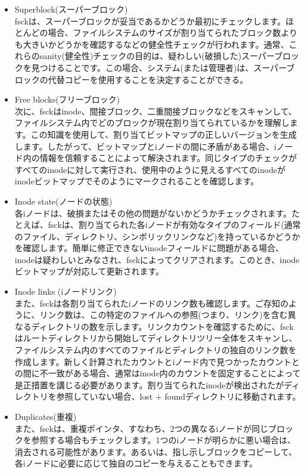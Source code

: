 \begin{itemize}
\item
  Superblock(スーパーブロック)\\
  fsckは、スーパーブロックが妥当であるかどうか最初にチェックします。ほとんどの場合、ファイルシステムのサイズが割り当てられたブロック数よりも大きいかどうかを確認するなどの健全性チェックが行われます。通常、これらのsanity(健全性)チェックの目的は、疑わしい(破損した)スーパーブロックを見つけることです。この場合、システム(または管理者)は、スーパーブロックの代替コピーを使用することを決定することができる。
\item
  Free blocks(フリーブロック)\\
  次に、fsckはinode、間接ブロック、二重間接ブロックなどをスキャンして、ファイルシステム内でどのブロックが現在割り当てられているかを理解します。この知識を使用して、割り当てビットマップの正しいバージョンを生成します。したがって、ビットマップとiノードの間に矛盾がある場合、iノード内の情報を信頼することによって解決されます。同じタイプのチェックがすべてのinodeに対して実行され、使用中のように見えるすべてのinodeがinodeビットマップでそのようにマークされることを確認します。
\item
  Inode state(ノードの状態)\\
  各iノードは、破損またはその他の問題がないかどうかチェックされます。たとえば、fsckは、割り当てられた各iノードが有効なタイプのフィールド(通常のファイル、ディレクトリ、シンボリックリンクなど)を持っているかどうかを確認します。簡単に修正できないinodeフィールドに問題がある場合、inodeは疑わしいとみなされ、fsckによってクリアされます。このとき、inodeビットマップが対応して更新されます。
\item
  Inode links (iノードリンク)\\
  また、fsckは各割り当てられたiノードのリンク数も確認します。ご存知のように、リンク数は、この特定のファイルへの参照(つまり、リンク)を含む異なるディレクトリの数を示します。リンクカウントを確認するために、fsckはルートディレクトリから開始してディレクトリツリー全体をスキャンし、ファイルシステム内のすべてのファイルとディレクトリの独自のリンク数を作成します。新しく計算されたカウントとiノード内で見つかったカウントとの間に不一致がある場合、通常はinode内のカウントを固定することによって是正措置を講じる必要があります。割り当てられたinodeが検出されたがディレクトリを参照していない場合、lost
  + foundディレクトリに移動されます。
\item
  Duplicates(重複)\\
  また、fsckは、重複ポインタ、すなわち、2つの異なるiノードが同じブロックを参照する場合もチェックします。1つのiノードが明らかに悪い場合は、消去される可能性があります。あるいは、指し示しブロックをコピーして、各iノードに必要に応じて独自のコピーを与えることもできます。

\end{itemize}

